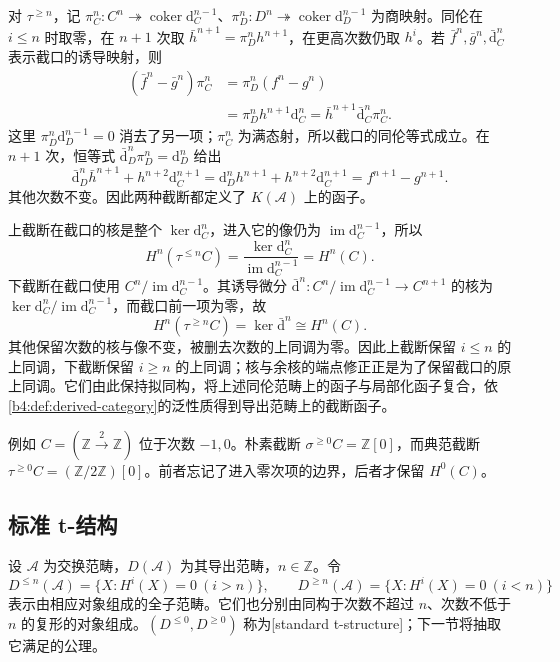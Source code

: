 \ProseParagraphBreak
对 \(\tau^{\ge n}\)，记 \(\pi_C^n:C^n\twoheadrightarrow\operatorname{coker}\mathrm d_C^{n-1}\)、\(\pi_D^n:D^n\twoheadrightarrow\operatorname{coker}\mathrm d_D^{n-1}\) 为商映射。同伦在 \(i\le n\) 时取零，在 \(n+1\) 次取 \(\bar h^{n+1}=\pi_D^n h^{n+1}\)，在更高次数仍取 \(h^i\)。若 \(\bar f^n,\bar g^n,\bar{\mathrm d}_C^n\) 表示截口的诱导映射，则
\[
	\begin{aligned}
		(\bar f^n-\bar g^n)\pi_C^n &=\pi_D^n(f^n-g^n)\\
		&=\pi_D^n h^{n+1}\mathrm d_C^n =\bar h^{n+1}\bar{\mathrm d}_C^n\pi_C^n.
	\end{aligned}
\]
这里 \(\pi_D^n\mathrm d_D^{n-1}=0\) 消去了另一项；\(\pi_C^n\) 为满态射，所以截口的同伦等式成立。在 \(n+1\) 次，恒等式 \(\bar{\mathrm d}_D^n\pi_D^n=\mathrm d_D^n\) 给出
\[
	\bar{\mathrm d}_D^n\bar h^{n+1}+h^{n+2}\mathrm d_C^{n+1} =\mathrm d_D^nh^{n+1}+h^{n+2}\mathrm d_C^{n+1} =f^{n+1}-g^{n+1}.
\]
其他次数不变。因此两种截断都定义了 \(K(\mathcal A)\) 上的函子。

\ProseParagraphBreak
上截断在截口的核是整个 \(\ker\mathrm{d}_C^n\)，进入它的像仍为 \(\operatorname{im}\mathrm{d}_C^{n-1}\)，所以
\[
	H^n(\tau^{\le n}C) =\frac{\ker\mathrm{d}_C^n}{\operatorname{im}\mathrm{d}_C^{n-1}} =H^n(C).
\]
下截断在截口使用 \(C^n/\operatorname{im}\mathrm{d}_C^{n-1}\)。其诱导微分 \(\bar{\mathrm{d}}^n:C^n/\operatorname{im}\mathrm{d}_C^{n-1}\rightarrow C^{n+1}\) 的核为 \(\ker\mathrm{d}_C^n/\operatorname{im}\mathrm{d}_C^{n-1}\)，而截口前一项为零，故
\[
	H^n(\tau^{\ge n}C)=\ker\bar{\mathrm{d}}^n\cong H^n(C).
\]
其他保留次数的核与像不变，被删去次数的上同调为零。因此上截断保留 \(i\le n\) 的上同调，下截断保留 \(i\ge n\) 的上同调；核与余核的端点修正正是为了保留截口的原上同调。它们由此保持拟同构，将上述同伦范畴上的函子与局部化函子复合，依\cref{b4:def:derived-category}的泛性质得到导出范畴上的截断函子。

\ProseParagraphBreak
例如 \(C=(\mathbb Z\xrightarrow{2}\mathbb Z)\) 位于次数 \(-1,0\)。朴素截断 \(\sigma^{\ge0}C=\mathbb Z[0]\)，而典范截断 \(\tau^{\ge0}C=(\mathbb Z/2\mathbb Z)[0]\)。前者忘记了进入零次项的边界，后者才保留 \(H^0(C)\)。

\subsection{标准 t-结构}
\label{b4:subsec:1901:02}

\begin{definition}\label{b4:def:standard-t-halves}
	设 \(\mathcal A\) 为交换范畴，\(D(\mathcal A)\) 为其导出范畴，\(n\in\mathbb Z\)。令
	\[
		D^{\le n}(\mathcal A)=\{X:H^i(X)=0\ (i>n)\},\qquad D^{\ge n}(\mathcal A)=\{X:H^i(X)=0\ (i<n)\}
	\]
	表示由相应对象组成的全子范畴。它们也分别由同构于次数不超过 \(n\)、次数不低于 \(n\) 的复形的对象组成。\((D^{\le0},D^{\ge0})\) 称为[standard t-structure]；下一节将抽取它满足的公理。
\end{definition}

